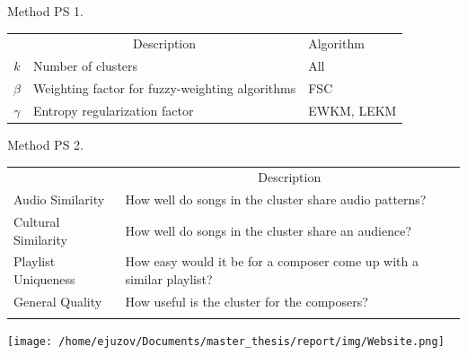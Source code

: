 \documentclass[aspectratio=1610]{beamer}
\begin{document}
\begin{frame}{Method PS 1.}
\begin{table}[H]
\begin{adjustbox}{width=\textwidth, totalheight=\baselineskip,keepaspectratio}
\begin{tabular}{cll}
  \hline\noalign{\smallskip}
  \multicolumn{1}{l}{Hyperparameter} & \multicolumn{1}{c}{Description} & Algorithm\\
\noalign{\smallskip}
  \hline
  \noalign{\smallskip}
  $k$ & Number of clusters & All \\
  \noalign{\smallskip}
  \hline
  \noalign{\smallskip}
  $\beta$ & Weighting factor for fuzzy-weighting algorithms  & FSC \\
  $\gamma$ & Entropy regularization factor & EWKM, LEKM \\
\end{tabular}
\end{adjustbox}
\end{table}
\end{frame}

\begin{frame}{Method PS 2.}
\begin{table}[H]
\begin{adjustbox}{width=\textwidth, totalheight=\baselineskip,keepaspectratio}
\begin{tabular}{ll}
  \hline\noalign{\smallskip}
  \multicolumn{1}{l}{Criteria} & \multicolumn{1}{c}{Description} \\
\noalign{\smallskip}
  \hline
  \noalign{\smallskip}
  Audio Similarity & How well do songs in the cluster share audio patterns? \\
  Cultural Similarity & How well do songs in the cluster share an audience? \\
  \noalign{\smallskip}
  \hline
  \noalign{\smallskip}
  Playlist Uniqueness & How easy would it be for a composer come up with a similar playlist? \\
  \noalign{\smallskip}
  General Quality & How useful is the cluster for the composers?  \\
  \noalign{\smallskip}
  \hline
\end{tabular}
\end{adjustbox}
\end{table}
\end{frame}

\begin{frame}
\begin{adjustbox}{width=\textwidth, totalheight=\baselineskip,keepaspectratio}
  \texttt{[image: /home/ejuzov/Documents/master\_thesis/report/img/Website.png]}
\end{adjustbox}
\end{frame}
\end{document}
